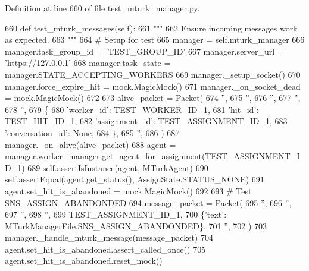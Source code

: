 Definition at line 660 of file test\+\_\+mturk\+\_\+manager.\+py.


\begin{DoxyCode}
660     \textcolor{keyword}{def }test\_mturk\_messages(self):
661         \textcolor{stringliteral}{"""}
662 \textcolor{stringliteral}{        Ensure incoming messages work as expected.}
663 \textcolor{stringliteral}{        """}
664         \textcolor{comment}{# Setup for test}
665         manager = self.mturk\_manager
666         manager.task\_group\_id = \textcolor{stringliteral}{'TEST\_GROUP\_ID'}
667         manager.server\_url = \textcolor{stringliteral}{'https://127.0.0.1'}
668         manager.task\_state = manager.STATE\_ACCEPTING\_WORKERS
669         manager.\_setup\_socket()
670         manager.force\_expire\_hit = mock.MagicMock()
671         manager.\_on\_socket\_dead = mock.MagicMock()
672 
673         alive\_packet = Packet(
674             \textcolor{stringliteral}{''},
675             \textcolor{stringliteral}{''},
676             \textcolor{stringliteral}{''},
677             \textcolor{stringliteral}{''},
678             \textcolor{stringliteral}{''},
679             \{
680                 \textcolor{stringliteral}{'worker\_id'}: TEST\_WORKER\_ID\_1,
681                 \textcolor{stringliteral}{'hit\_id'}: TEST\_HIT\_ID\_1,
682                 \textcolor{stringliteral}{'assignment\_id'}: TEST\_ASSIGNMENT\_ID\_1,
683                 \textcolor{stringliteral}{'conversation\_id'}: \textcolor{keywordtype}{None},
684             \},
685             \textcolor{stringliteral}{''},
686         )
687         manager.\_on\_alive(alive\_packet)
688         agent = manager.worker\_manager.get\_agent\_for\_assignment(TEST\_ASSIGNMENT\_ID\_1)
689         self.assertIsInstance(agent, MTurkAgent)
690         self.assertEqual(agent.get\_status(), AssignState.STATUS\_NONE)
691         agent.set\_hit\_is\_abandoned = mock.MagicMock()
692 
693         \textcolor{comment}{# Test SNS\_ASSIGN\_ABANDONDED}
694         message\_packet = Packet(
695             \textcolor{stringliteral}{''},
696             \textcolor{stringliteral}{''},
697             \textcolor{stringliteral}{''},
698             \textcolor{stringliteral}{''},
699             TEST\_ASSIGNMENT\_ID\_1,
700             \{\textcolor{stringliteral}{'text'}: MTurkManagerFile.SNS\_ASSIGN\_ABANDONDED\},
701             \textcolor{stringliteral}{''},
702         )
703         manager.\_handle\_mturk\_message(message\_packet)
704         agent.set\_hit\_is\_abandoned.assert\_called\_once()
705         agent.set\_hit\_is\_abandoned.reset\_mock()

\end{DoxyCode}
